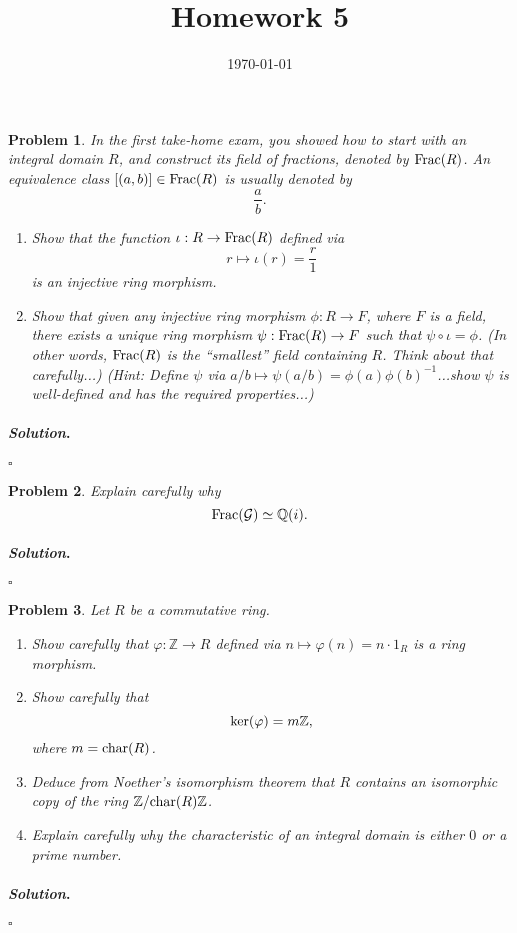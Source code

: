 \documentclass[reqno]{amsart}
\theoremstyle{plain}
\newtheorem{problem}{Problem}
\theoremstyle{definition}
\newenvironment{solution}{\paragraph{\emph{Solution}.}}{\hfill$\square$}
\begin{document}
 

\title[Homework 5]{Homework 5}

\date{\today} 
\maketitle 


\begin{problem}
In the first take-home exam, you showed how to start with an integral domain $R$, and construct its field of fractions, denoted by ${\rm Frac}(R)$.  An equivalence class $[(a,b)] \in {\rm Frac}(R)$ is usually denoted by
$$\frac{a}{b}. $$
\begin{enumerate}
\item Show that the function $\iota:R \rightarrow {\rm Frac}(R)$ defined via
$$r \mapsto \iota(r) = \frac{r}{1} $$
is an injective ring morphism.
\item Show that given any injective ring morphism $\phi:R \rightarrow F$, where $F$ is a field, there exists a unique ring morphism $\psi:{\rm Frac}(R) \rightarrow F$ such that $\psi \circ \iota = \phi$.  (In other words, ${\rm Frac}(R)$ is the ``smallest'' field containing $R$.  Think about that carefully...) (Hint:  Define $\psi$ via $a/b \mapsto \psi(a/b) = \phi(a)\phi(b)^{-1}$...show $\psi$ is well-defined and has the required properties...)
\end{enumerate}
\end{problem}
\begin{solution}

\end{solution} 

\begin{problem}
Explain carefully why 
$${\rm Frac}(\mathcal{G}) \simeq \mathbb{Q}(i). $$
\end{problem}
\begin{solution}

\end{solution} 

\begin{problem}
Let $R$ be a commutative ring.
\begin{enumerate}
\item Show carefully that $\varphi:\mathbb{Z} \rightarrow R$ defined via $n \mapsto \varphi(n) = n \cdot 1_{R}$ is a ring morphism.
\item Show carefully that 
$${\rm ker}(\varphi) = m\mathbb{Z}, $$
where $m = {\rm char}(R)$.
\item Deduce from Noether's isomorphism theorem that $R$ contains an isomorphic copy of the ring $\mathbb{Z}/{\rm char}(R)\mathbb{Z}$.
\item Explain carefully why the characteristic of an integral domain is either $0$ or a prime number.
\end{enumerate}
\end{problem}
\begin{solution}

\end{solution} 
\end{document}
